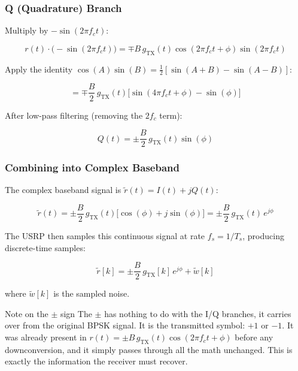 \subsubsection{Q (Quadrature) Branch}

Multiply by $-\sin(2\pi f_c t)$:

\begin{equation}
r(t)\cdot\big(-\sin(2\pi f_c t)\big) = \mp B\,g_{\text{TX}}(t)\cos(2\pi f_c t + \phi)\sin(2\pi f_c t)
\end{equation}

Apply the identity $\cos(A)\sin(B) = \tfrac{1}{2}[\sin(A + B) - \sin(A - B)]$:

\begin{equation}
= \mp \frac{B}{2}\,g_{\text{TX}}(t)\Big[\sin(4\pi f_c t + \phi) - \sin(\phi)\Big]
\end{equation}

After low-pass filtering (removing the $2f_c$ term):

\begin{equation}
Q(t) = \pm \frac{B}{2}\,g_{\text{TX}}(t)\sin(\phi)
\end{equation}

\subsubsection{Combining into Complex Baseband}

The complex baseband signal is $\tilde{r}(t) = I(t) + jQ(t)$:

\begin{equation}
\tilde{r}(t) = \pm \frac{B}{2}\,g_{\text{TX}}(t)\Big[\cos(\phi) + j\sin(\phi)\Big] = \pm \frac{B}{2}\,g_{\text{TX}}(t)\,e^{j\phi}
\end{equation}

The USRP then samples this continuous signal at rate $f_s = 1/T_s$, producing discrete-time samples:

\begin{equation}
\tilde{r}[k] = \pm \frac{B}{2}\,g_{\text{TX}}[k]\,e^{j\phi} + \tilde{w}[k]
\end{equation}

where $\tilde{w}[k]$ is the sampled noise.

\begin{IntuitionBox}{Note on the $\pm$ sign}
The $\pm$ has nothing to do with the I/Q branches, it carries over from the original BPSK signal. It is the transmitted symbol: $+1$ or $-1$. It was already present in $r(t) = \pm B\,g_{\text{TX}}(t)\cos(2\pi f_c t + \phi)$ before any downconversion, and it simply passes through all the math unchanged. This is exactly the information the receiver must recover.
\end{IntuitionBox}

